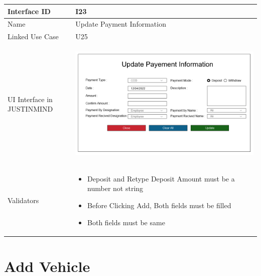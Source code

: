 \documentclass[12pt,a4paper]{report}
\begin{document}
\begin{tabular}{ | m{3cm} | m{12cm}| } \hline

Interface ID & I23  \\\hline

Name  &  Update Payment Information \\ \hline

Linked Use Case & U25	 \\ \hline

UI Interface in JUSTINMIND & \begin{center} \includegraphics[scale=0.3]{./User Interface/UI-022Update Payment Information.png}\end{center}  \\ \hline

Validators & 
\begin{itemize}
\item   Deposit and Retype Deposit Amount must be a number not string
\item  Before Clicking Add, Both fields must be filled
\item  Both fields must be same


\end{itemize}
\\ \hline
\end{tabular} 
\section{Add Vehicle}
\end{document}
